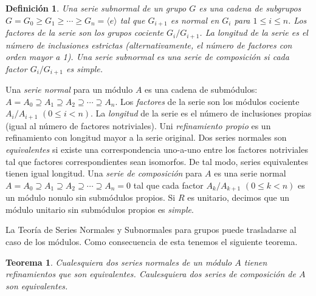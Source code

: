 \documentclass{report}
\newtheorem{theorem}{Teorema}
\newtheorem{definition}{Definición}
\begin{document}
  \begin{definition}
    Una \emph{serie subnormal} de un grupo \(G\) es una cadena de subgrupos \(G = G_0 \geq G_1 \geq \cdots \geq G_n = \langle e \rangle\) tal que \(G_{i + 1}\) es normal en \(G_i\) para \(1 \leq i \leq n\).
    Los \emph{factores} de la serie son los grupos cociente \(G_i / G_{i + 1}\).
    La \emph{longitud} de la serie es el número de inclusiones estrictas (alternativamente, el número de factores con orden mayor a 1).
    Una serie subnormal es una \emph{serie de composición} si cada factor \(G_i / G_{i + 1}\) es simple.
  \end{definition}

  Una \emph{serie normal} para un módulo \(A\) es una cadena de submódulos:
  \(A = A_0 \supseteq A_1 \supseteq A_2 \supseteq \cdots \supseteq A_n\).
  Los \emph{factores} de la serie son los módulos cociente \(A_i / A_{i + 1}\) \((0 \leq i < n)\).
  La \emph{longitud} de la serie es el número de inclusiones propias (igual al número de factores notriviales).
  Uni \emph{refinamiento propio} es un refinamiento con longitud mayor a la serie original.
  Dos series normales son \emph{equivalentes} si existe una correspondencia uno-a-uno entre los factores notriviales tal que factores correspondientes sean isomorfos.
  De tal modo, series equivalentes tienen igual longitud.
  Una \emph{serie de composición} para \(A\) es una serie normal
  \(A = A_0 \supseteq A_1 \supseteq A_2 \supseteq \cdots \supseteq A_n = 0\)
  tal que cada factor \(A_k / A_{k + 1}\) \((0 \leq k < n)\) es un módulo nonulo sin submódulos propios.
  Si \(R\) es unitario, decimos que un módulo unitario sin submódulos propios es \emph{simple}.

  La Teoría de Series Normales y Subnormales para grupos puede trasladarse al caso de los módulos.
  Como consecuencia de esta tenemos el siguiente teorema.
  \begin{theorem}
    \label{theorem:refinementAndEquivalenceOfNormalSeries}
    Cualesquiera dos series normales de un módulo \(A\) tienen refinamientos que son equivalentes.
    Caulesquiera dos series de composición de \(A\) son equivalentes.
  \end{theorem}
\end{document}
